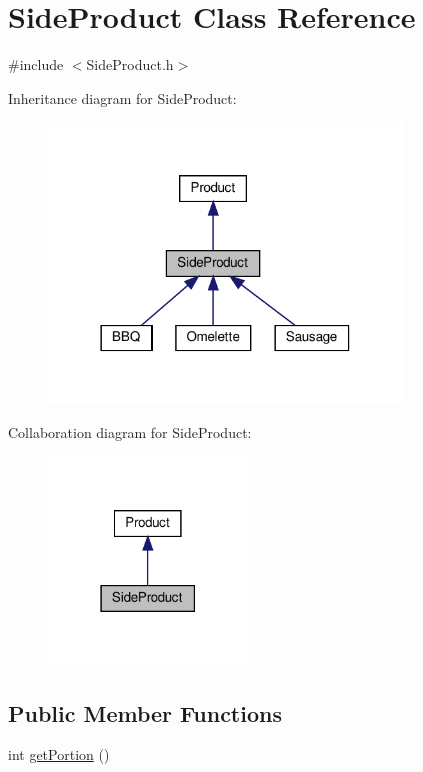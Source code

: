 \hypertarget{classSideProduct}{}\section{Side\+Product Class Reference}
\label{classSideProduct}


{\ttfamily \#include $<$Side\+Product.\+h$>$}



Inheritance diagram for Side\+Product\+:
\nopagebreak
\begin{figure}[H]
\begin{center}
\leavevmode
\includegraphics[width=266pt]{classSideProduct__inherit__graph}
\end{center}
\end{figure}


Collaboration diagram for Side\+Product\+:
\nopagebreak
\begin{figure}[H]
\begin{center}
\leavevmode
\includegraphics[width=150pt]{classSideProduct__coll__graph}
\end{center}
\end{figure}
\subsection*{Public Member Functions}
\begin{DoxyCompactItemize}
\item 
int \hyperlink{classSideProduct_a8265dbcfcde3880817bfb8d82e563700}{get\+Portion} ()
\end{DoxyCompactItemize}
